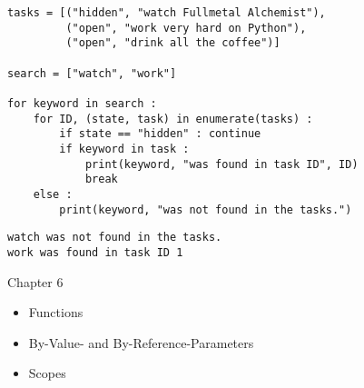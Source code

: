 
\begin{frame}[fragile]
%
\begin{codebox}
\begin{verbatim}
tasks = [("hidden", "watch Fullmetal Alchemist"),
         ("open", "work very hard on Python"),
         ("open", "drink all the coffee")]
         
search = ["watch", "work"]

for keyword in search :
    for ID, (state, task) in enumerate(tasks) :
        if state == "hidden" : continue
        if keyword in task :
            print(keyword, "was found in task ID", ID)
            break
    else :
        print(keyword, "was not found in the tasks.")
\end{verbatim}
\end{codebox}
%
\begin{cmdbox}
\begin{verbatim}
watch was not found in the tasks.
work was found in task ID 1
\end{verbatim}
\end{cmdbox}
%
\end{frame}


\begin{frame}[fragile]{Chapter 6}
%
\begin{itemize}
\item Functions
\item By-Value- and By-Reference-Parameters
\item Scopes
\end{itemize}
%
\end{frame}


